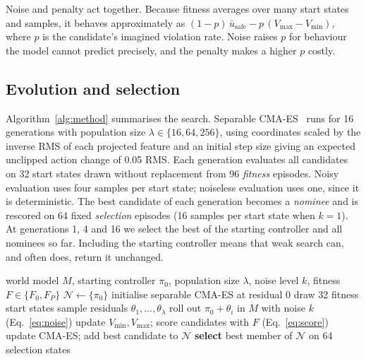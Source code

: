 \documentclass[sigconf,dvipsnames]{acmart}
\begin{document}
Noise and penalty act together. Because fitness averages over many start states
and samples, it behaves approximately as
$(1-p)\,\bar{u}_{\text{safe}} - p\,(V_{\max}-V_{\min})$, where $p$ is the
candidate's imagined violation rate. Noise raises $p$ for behaviour the model
cannot predict precisely, and the penalty makes a higher $p$ costly.

\subsection{Evolution and selection}

Algorithm~\ref{alg:method} summarises the search. Separable
CMA-ES~\cite{ros2008sep} runs for 16 generations with population size
$\lambda\in\{16,64,256\}$, using coordinates scaled by the inverse RMS of each
projected feature and an initial step size giving an expected unclipped action
change of 0.05 RMS. Each generation evaluates all candidates on 32 start states
drawn without replacement from 96 \emph{fitness} episodes. Noisy evaluation uses
four samples per start state; noiseless evaluation uses one, since it is
deterministic. The best candidate of each generation becomes a \emph{nominee}
and is rescored on 64 fixed \emph{selection} episodes (16 samples per start
state when $k=1$). At generations 1, 4 and 16 we select the best of the starting
controller and all nominees so far. Including the starting controller means
that weak search can, and often does, return it unchanged.

\begin{algorithm}[t]
\caption{Residual evolution in imagination}
\label{alg:method}
\begin{algorithmic}[1]
\Require world model $M$, starting controller $\pi_0$, population size $\lambda$, noise level $k$, fitness $F\in\{F_0,F_P\}$
\State $\mathcal{N}\gets\{\pi_0\}$ 
\State initialise separable CMA-ES at residual $0$
  \State draw 32 fitness start states
  \State sample residuals $\theta_1,\dots,\theta_\lambda$
    \State roll out $\pi_0+\theta_i$ in $M$ with noise $k$ (Eq.~\ref{eq:noise})
  \EndFor
  \State update $V_{\min},V_{\max}$; score candidates with $F$ (Eq.~\ref{eq:score})
  \State update CMA-ES; add best candidate to $\mathcal{N}$
    \State \textbf{select} best member of $\mathcal{N}$ on 64 selection states
  \EndIf
\EndFor
\end{algorithmic}
\end{algorithm}
\end{document}
